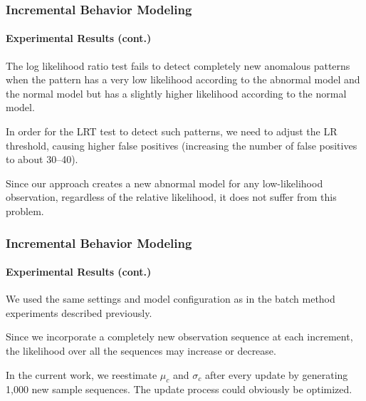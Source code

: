 
\begin{frame}
    \frametitle{Incremental Behavior Modeling}
    \framesubtitle{Experimental Results (cont.)}
    
    The log likelihood ratio test fails to detect completely new anomalous
    patterns when the pattern has a very low likelihood according to the
    abnormal model and the normal model but has a slightly higher
    likelihood according to the normal model. 
    
    \bigskip
    
    In order for the LRT test to
    detect such patterns, we need to adjust the LR threshold, causing
    higher false positives (increasing the number of false positives to
    about 30--40).  
    
    \bigskip
    
    Since our approach creates a new abnormal model for
    any low-likelihood observation, regardless of the relative likelihood,
    it does not suffer from this problem.
    
\end{frame}


\begin{frame}
    \frametitle{Incremental Behavior Modeling}
    \framesubtitle{Experimental Results (cont.)}
    
    We used the same settings and model configuration as in the batch 
    method experiments described previously.
   
    \bigskip

    Since we incorporate a completely new observation sequence at each 
    increment, the likelihood over all the sequences may increase or 
    decrease. 
    
    \bigskip
    
    In the current work, we reestimate $\mu_c$ and $\sigma_c$ after every 
    update by generating 1,000 new sample sequences.  The update process 
    could obviously be optimized.

\end{frame}


